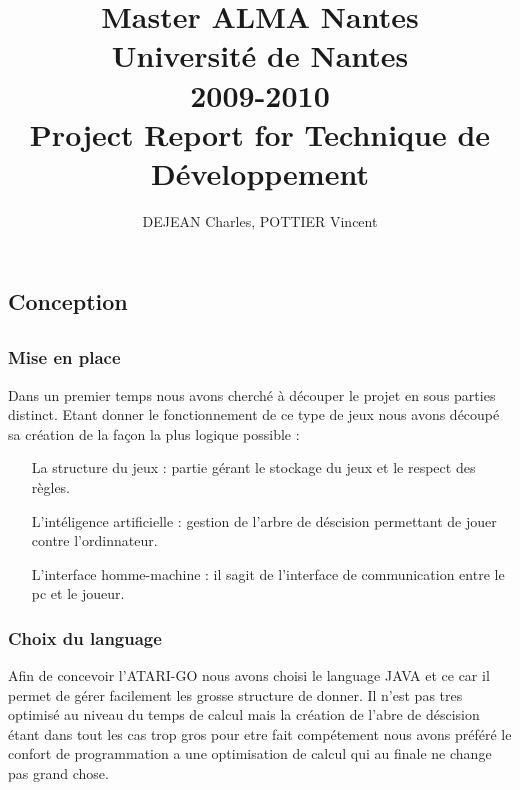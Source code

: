 \documentclass[12pt,a4paper,utf8x]{report}
\title
{
	\normalsize{Master ALMA Nantes\\
	Université de Nantes\\
	2009-2010}\\
	\vspace{15mm}
	\Huge{Project Report for Technique de Développement}
}
\author{DEJEAN Charles, POTTIER Vincent\\
	\vspace{45mm}
}
\begin{document}
\maketitle

%

\tableofcontents
\clearpage

\begin{onehalfspace}

\chapter{Conception}

\section{}

	\subsection{Mise en place}

		Dans un premier temps nous avons cherché à découper le projet en sous parties distinct. Etant donner le fonctionnement de ce type de jeux
		nous avons découpé sa création de la façon la plus logique possible :
		\begin{itemize}
			\item[La structure du jeux] : partie gérant le stockage du jeux et le respect des règles.
			\item[L'intéligence artificielle] : gestion de l'arbre de déscision permettant de jouer contre l'ordinnateur. 
			\item[L'interface homme-machine] : il sagit de l'interface de communication entre le pc et le joueur.
		\end{itemize}
		
	\subsection{Choix du language}
	
		Afin de concevoir l'ATARI-GO nous avons choisi le language JAVA et ce car il permet de gérer facilement les grosse structure de donner. 
		Il n'est pas tres optimisé au niveau du temps de calcul mais la création de l'abre de déscision étant dans tout les cas trop gros pour etre fait
		compétement nous avons préféré le confort de programmation a une optimisation de calcul qui au finale ne change pas grand chose.


\end{onehalfspace}
\end{document}
